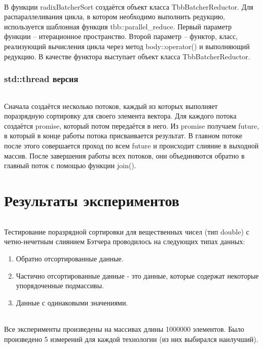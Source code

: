 \documentclass[12pt,a4paper]{article}
\begin{document}
\paragraph{} В функции radixBatcherSort создаётся объект класса TbbBatcherReductor. Для распараллеливания цикла, в котором необходимо выполнить редукцию, используется шаблонная функция tbb::parallel\_reduce. Первый параметр функции – итерационное пространство. Второй параметр – функтор, класс, реализующий вычисления цикла через метод body::operator() и выполняющий редукцию. В качестве функтора выступает объект класса TbbBatcherReductor.

\section*{std::thread версия}
\paragraph{}Сначала создаётся несколько потоков, каждый из которых выполняет поразрядную сортировку для своего элемента вектора. Для каждого потока создаётся promise, который потом передаётся в него. Из promise получаем future, в который в конце работы потока присваивается результат. В главном потоке после этого совершается проход по всем future и происходит слияние в выходной массив. После завершения работы всех потоков, они объединяются обратно в главный поток с помощью функции join().


\newpage
\part*{Результаты экспериментов}
\paragraph{} Тестирование поразрядной сортировки для вещественных чисел (тип double) с четно-нечетным слиянием Бэтчера проводилось на следующих типах данных:

\begin{enumerate} 
 данные.
\item Обратно отсортированные данные.
\item Частично отсортированные данные - это данные, которые содержат некоторые упорядоченные подмассивы. 
\item Данные с одинаковыми значениями.
\end{enumerate} 
\paragraph{} Все эксперименты произведены на массивах длины 1000000 элементов. Было произведено 5 измерений для каждой технологии (из них выбирался наилучший).
\end{document}
